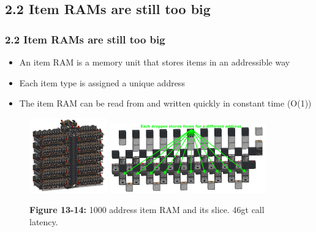 \documentclass[aspectratio=169]{beamer}
\begin{document}
\subsection{2.2 Item RAMs are still too big}


\begin{frame}
	\frametitle{2.2 Item RAMs are still too big}

    \begin{itemize}
		\item An item RAM is a memory unit that stores items in an addressible way
        \item Each item type is assigned a unique address
        \item The item RAM can be read from and written quickly in constant time (O(1))
	\end{itemize}
    \begin{figure}
        \includegraphics[width=0.3\textwidth]{bigbigram.png}
        \includegraphics[width=0.6\textwidth]{bigbigramslice.png}
        \caption{\textbf{Figure 13-14:} 1000 address item RAM and its slice. 46gt call latency.}
	
    \end{figure}
\end{frame}
\end{document}

